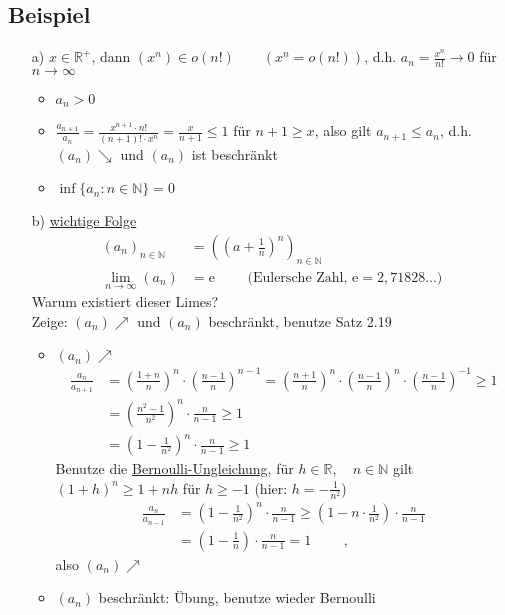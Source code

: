 \documentclass[12pt, titlepage]{article}
\newcommand{\R}{\mathds{R}}
\newcommand{\N}{\mathds{N}}
\newcommand{\e}{\textrm{e}}
\newcommand{\infn}{n\rightarrow\infty}
\renewcommand{\>}{\rightarrow}
\renewcommand{\*}{\cdot}
\begin{document}
	\subsection{Beispiel}
	\begin{itemize}
		\item[a)] $x\in\R^+$, dann $(x^n)\in o(n!)\qquad(x^n=o(n!))$, d.h. $a_n=\frac{x^n}{n!}\> 0$ für $\infn$
		\begin{itemize}
			\item $a_n>0$
			\item $\frac{a_{n+1}}{a_n}=\frac{x^{n+1}\*n!}{(n+1)!\*x^n}=\frac{x}{n+1}\leq 1$ für $n+1\geq x$, also gilt $a_{n+1}\leq a_n$, d.h. $(a_n)\searrow$ und $(a_n)$ ist beschränkt
			\item $\inf\{a_n\colon n\in\N\}=0$
		\end{itemize}
		\item[b)] \underline{wichtige Folge}\\
		\begin{align*}
			(a_n)_{n\in\N}&=((a+\frac{1}{n})^n)_{n\in\N}\\
			\lim\limits_{\infn}(a_n)&=\e\qquad\textrm{ (Eulersche Zahl, $\e=2,71828...$)}
		\end{align*}
		Warum existiert dieser Limes?\\
		Zeige: $(a_n)\nearrow$ und $(a_n)$ beschränkt, benutze Satz 2.19
		\begin{itemize}
			\item $(a_n)\nearrow$
			\begin{align*}
				\frac{a_n}{a_{n+1}}&=(\frac{1+n}{n})^n\*(\frac{n-1}{n})^{n-1}=(\frac{n+1}{n})^n\*(\frac{n-1}{n})^n\*(\frac{n-1}{n})^{-1}\geq 1\\
				&=(\frac{n^2-1}{n^2})^n\*\frac{n}{n-1}\geq1\\
				&=(1-\frac{1}{n^2})^n\*\frac{n}{n-1}\geq 1
			\end{align*}
			Benutze die \underline{Bernoulli-Ungleichung}, für $h\in\R,\quad n\in\N$ gilt $(1+h)^n\geq 1+nh$ für $h\geq -1$ (hier: $h=-\frac{1}{n^2}$)
			\begin{align*}
				\frac{a_n}{a_{n-1}}&=(1-\frac{1}{n^2})^n\*\frac{n}{n-1}\geq (1-n\*\frac{1}{n^2})\*\frac{n}{n-1}\\
				&=(1-\frac{1}{n})\*\frac{n}{n-1}=1\qquad\textrm{ , }
			\end{align*}
			also $(a_n)\nearrow$
			\item $(a_n)$ beschränkt: Übung, benutze wieder Bernoulli
		\end{itemize}
	\end{itemize}
\end{document}

